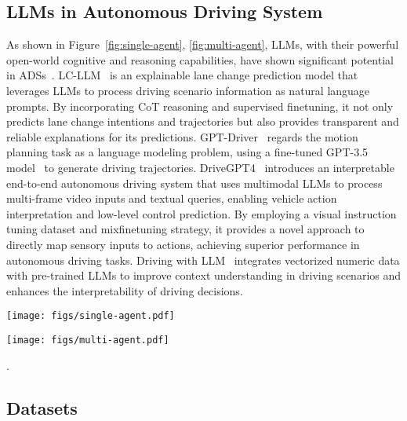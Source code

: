 \subsection{LLMs in Autonomous Driving System}
\label{app:single}
As shown in Figure~\ref{fig:single-agent}, \ref{fig:multi-agent}, LLMs, with their powerful open-world cognitive and reasoning capabilities, have shown significant potential in ADSs~\cite{yang2023llm4drive,li2023towards}. 
LC-LLM~\cite{peng2024lc} is an explainable lane change prediction model that leverages LLMs to process driving scenario information as natural language prompts. By incorporating CoT reasoning and supervised finetuning, it not only predicts lane change intentions and trajectories but also provides transparent and reliable explanations for its predictions.
GPT-Driver~\cite{mao2023gpt} regards the motion planning task as a language modeling problem, using a fine-tuned GPT-3.5 model~\cite{ye2023comprehensive} to generate driving trajectories. 
DriveGPT4~\cite{xu2024drivegpt4} introduces an interpretable end-to-end autonomous driving system that uses multimodal LLMs to process multi-frame video inputs and textual queries, enabling vehicle action interpretation and low-level control prediction. By employing a visual instruction tuning dataset and mixfinetuning strategy, it provides a novel approach to directly map sensory inputs to actions, achieving superior performance in autonomous driving tasks.
Driving with LLM~\cite{chen2024driving} integrates vectorized numeric data with pre-trained LLMs to improve context understanding in driving scenarios and enhances the interpretability of driving decisions.

\begin{figure*}[t]
\centering
     \texttt{[image: figs/single-agent.pdf]}
    \caption{An example of an LLM-based single-agent ADS~\cite{wen2023dilu}.}
    \label{fig:single-agent}
\end{figure*}

\begin{figure*}[t]
\centering
     \texttt{[image: figs/multi-agent.pdf]}
    \caption{The communication among multiple agents in an LLM-based multi-agent system~\cite{hu2024agentscodriver}}.
    \label{fig:multi-agent}
\end{figure*}

\subsection{Datasets}
\label{app:datasets}


